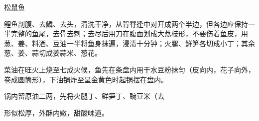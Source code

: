\begin{recipe}{松鼠鱼}

\ingredients


\cooking

\step 鲤鱼剖腹、去鱗、去头，清洗干净，从背脊逢中对开成两个半边，但各边应保持一半完整的鱼尾，去骨去刺；去尽后用刀在腹面划成大荔枝形，不要伤着鱼皮，用葱、姜、料酒、豆油一半将鱼身抹遍，浸渍十分钟；火腿、鲜笋各切成小丁；其余葱、姜、蒜切成姜蒜米、葱花。

\step 菜油在旺火上烧至七成火候，鱼先在条盘内用干水豆粉抹匀（皮向内，花子向外，卷成圆筒形），下油锅炸至呈金黄色时起锅摆在盘内。

\step 锅内留原油二两，先将火腿丁、鲜笋丁、豌豆米（去

\notes

形似松厚，外酥内嫩，甜酸味道。

\end{recipe}

